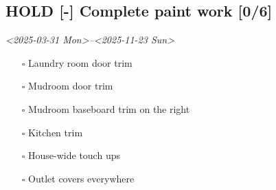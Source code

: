 \documentclass[12pt,twoside]{article}
\begin{document}
\subsection{{\bfseries\sffamily HOLD} {[}-] Complete paint work [0/6]}
\label{sec:orgbf5f3e6}
\textit{<2025-03-31 Mon>--<2025-11-23 Sun>}
\begin{itemize}
\item[{$\square$}] Laundry room door trim
\item[{$\square$}] Mudroom door trim
\item[{$\square$}] Mudroom baseboard trim on the right
\item[{$\square$}] Kitchen trim
\item[{$\square$}] House-wide touch ups
\item[{$\square$}] Outlet covers everywhere
\end{itemize}
\end{document}
